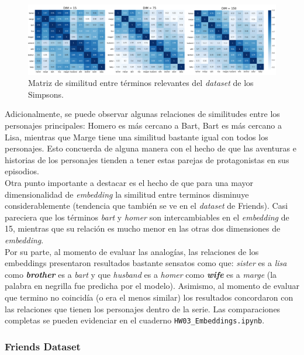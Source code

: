 \begin{figure}[H]
    \centering
    \includegraphics[width=\textwidth]{doc/images/simpsons_sim_matrix.png}
    \caption{Matriz de similitud entre términos relevantes del \textit{dataset} de los Simpsons.}
    \label{fig:simpsons_sim_matrix}
\end{figure}

Adicionalmente, se puede observar algunas relaciones de similitudes entre los personajes principales: Homero es más cercano a Bart, Bart es más cercano a Lisa, mientras que Marge tiene una similitud bastante igual con todos los personajes. Esto concuerda de alguna manera con el hecho de que las aventuras e historias de los personajes tienden a tener estas parejas de protagonistas en sus episodios.  \\

Otra punto importante a destacar es el hecho de que para una mayor dimensionalidad de \textit{embedding} la similitud entre terminos disminuye considerablemente (tendencia que también se ve en el \textit{dataset} de Friends). Casi pareciera que los términos \textit{bart} y \textit{homer} son intercambiables en el \textit{embedding} de 15, mientras que su relación es mucho menor en las otras dos dimensiones de \textit{embedding}. \\

Por su parte, al momento de evaluar las analogías, las relaciones de los embeddings presentaron resultados bastante sensatos como que: \textit{sister} es a \textit{lisa} como \textit{\textbf{brother}} es a \textit{bart} y que \textit{husband} es a \textit{homer} como \textit{\textbf{wife}} es a \textit{marge} (la palabra en negrilla fue predicha por el modelo). Asimismo, al momento de evaluar que termino no coincidía (o era el menos similar) los resultados concordaron con las relaciones que tienen los personajes dentro de la serie. Las comparaciones completas se pueden evidenciar en el cuaderno \texttt{HW03\_Embeddings.ipynb}.

\subsubsection{Friends Dataset}

